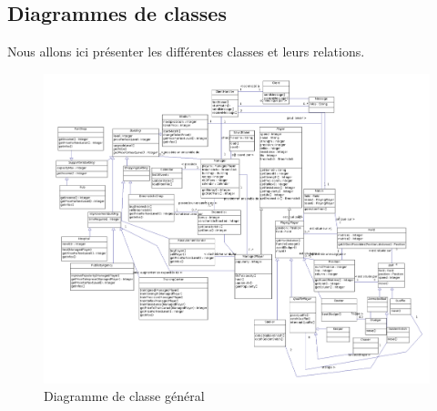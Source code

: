 \documentclass[a4paper,titlepage]{scrreprt}
\begin{document}
\begin{itemize}
  \subsection{Diagrammes de classes}
  Nous allons ici présenter les différentes classes et leurs relations.
    \begin{figure}[H]
    \center
    \includegraphics[scale=0.3]{uml/class/ClassDiagram.png}
    \caption{Diagramme de classe général}
  \end{figure}	

\end{itemize}
\end{document}
